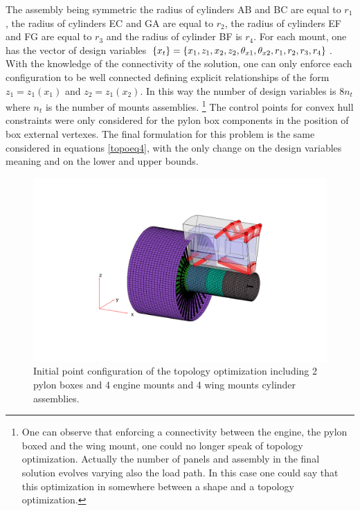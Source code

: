    The assembly being symmetric the radius of cylinders AB and BC are equal to $r_1$, the radius of cylinders EC and GA are equal to $r_2$, the radius of cylinders EF and FG are equal to $r_3$ and the radius of cylinder BF is $r_4$. For each mount, one has the vector of design variables  $\left\lbrace{x_t}\right \rbrace=\left\lbrace{x_1,z_1,x_2,z_2,\theta_{x1},\theta_{x2},r_1,r_2,r_3,r_4}\right \rbrace$. With the knowledge of the connectivity of the solution, one can only enforce each configuration to be well connected defining explicit relationships of the form $z_1=z_1(x_1)$ and $z_2=z_1(x_2)$. In this way the number of design variables is $8n_t$ where $n_t$ is the number of mounts assemblies. \footnote{One can observe that enforcing a connectivity between the engine, the pylon boxed and the wing mount, one could no longer speak of topology optimization. Actually the number of panels and assembly in the final solution evolves varying also the load path. In this case one could say that this optimization in somewhere between a shape and a topology optimization.} The control points for convex hull constraints were only considered for the pylon box components in the position of box external vertexes. The final formulation for this problem is the same considered in equations \ref{topoeq4}, with the only change on the design variables meaning and on the lower and upper bounds.
    \begin{figure}[!ht]
               \centering
                \includegraphics[width=\textwidth]{images/Ch3/pylon_components_000}
              \caption{Initial point configuration of the topology optimization including 2 pylon boxes and 4 engine mounts and 4 wing mounts cylinder assemblies.  }
              \label{fig:3.43}       %
         \end{figure}
